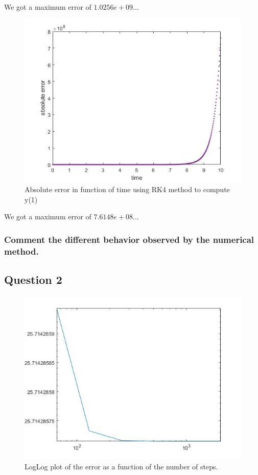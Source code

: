 \documentclass[a4paper, 11pt]{article}
\begin{document}
			We got a maximum error of $1.0256e+09$...
			
			\begin{figure}[H]
				\centering
				\includegraphics[width=\linewidth]{ex1_rk4.jpg}
				\caption{Absolute error in function of time using RK4 method to compute y(1)}
				\label{fig:ex1_rk4}
			\end{figure}
		
			We got a maximum error of $7.6148e+08$...
			
			\subsubsection*{Comment the different behavior observed by the numerical method.}
				
		\subsection*{Question 2}
			\begin{figure}[H]
				\centering
				\includegraphics[width=\linewidth]{ex2.jpg}
				\caption{LogLog plot of the error as a function of the number of steps.}
				\label{fig:ex2}
			\end{figure}
		
\end{document}
